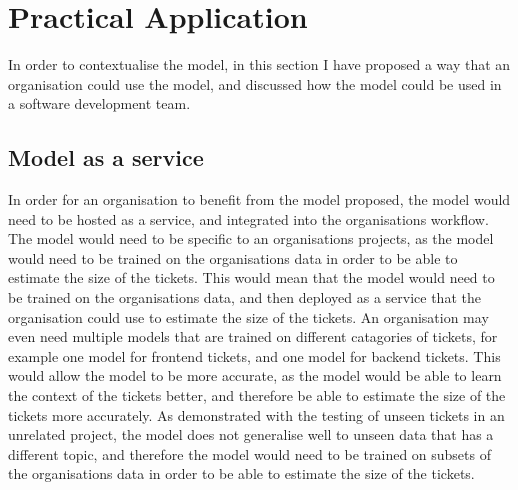 \documentclass{UoYCSproject}
\begin{document}



    \chapter{Practical Application}
    \label{ch:practical-application}

    In order to contextualise the model, in this section I have proposed a way that an organisation could use the model, and discussed how the model could be used in a software development team.
    \section{Model as a service}\label{sec:model-as-a-service}

In order for an organisation to benefit from the model proposed, the model would need to be hosted as a service, and integrated into the organisations workflow.
The model would need to be specific to an organisations projects, as the model would need to be trained on the organisations data in order to be able to estimate the size of the tickets.
This would mean that the model would need to be trained on the organisations data, and then deployed as a service that the organisation could use to estimate the size of the tickets.
An organisation may even need multiple models that are trained on different catagories of tickets, for example one model for frontend tickets, and one model for backend tickets.
This would allow the model to be more accurate, as the model would be able to learn the context of the tickets better, and therefore be able to estimate the size of the tickets more accurately.
As demonstrated with the testing of unseen tickets in an unrelated project, the model does not generalise well to unseen data that has a different topic, and therefore the model would need to be trained on subsets of the organisations data in order to be able to estimate the size of the tickets.
\end{document}
